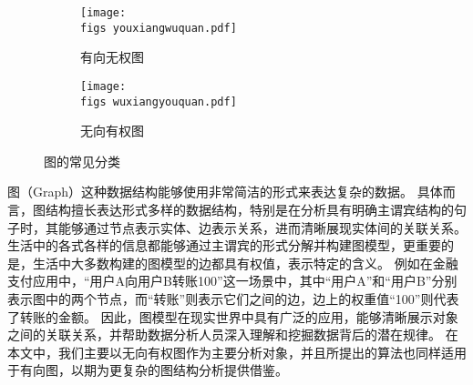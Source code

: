 \begin{figure}[h!]
    \def\wscorevone{0.48}
    \centering
        \begin{subfigure}[t]{\wscorevone\linewidth}
            \centering
            \resizebox{\linewidth}{!}
            {
                \texttt{[image: \\figs youxiangwuquan.pdf]}
            }
            \caption{有向无权图}
            \label{fig:example_noweight}
        \end{subfigure}
        \hfill
        \begin{subfigure}[t]{\wscorevone\linewidth}
            \centering
            \resizebox{\linewidth}{!}
            {
                \texttt{[image: \\figs wuxiangyouquan.pdf]}
            }
            \caption{无向有权图}
            \label{fig:example_weight}
        \end{subfigure}
        \label{fig:definition}
        \caption{图的常见分类}
    \end{figure}

图（Graph）这种数据结构能够使用非常简洁的形式来表达复杂的数据。
具体而言，图结构擅长表达形式多样的数据结构，特别是在分析具有明确主谓宾结构的句子时，其能够通过节点表示实体、边表示关系，进而清晰展现实体间的关联关系。
生活中的各式各样的信息都能够通过主谓宾的形式分解并构建图模型，更重要的是，生活中大多数构建的图模型的边都具有权值，表示特定的含义。
例如在金融支付应用中，“用户A向用户B转账100”这一场景中，其中“用户A”和“用户B”分别表示图中的两个节点，而“转账”则表示它们之间的边，边上的权重值“100”则代表了转账的金额。
因此，图模型在现实世界中具有广泛的应用，能够清晰展示对象之间的关联关系，并帮助数据分析人员深入理解和挖掘数据背后的潜在规律。
在本文中，我们主要以无向有权图作为主要分析对象，并且所提出的算法也同样适用于有向图，以期为更复杂的图结构分析提供借鉴。

